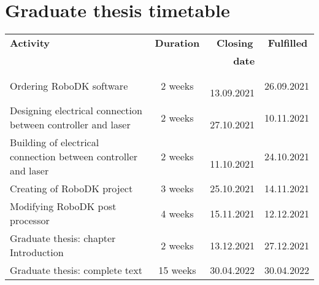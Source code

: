 ﻿\chapter{Graduate thesis timetable \label{ch:ApendPLAN}}


\begin{center}
\begin{tabular}{|p{8cm}|c|r|r|}
  \hline
  \textbf{\hspace{3.3cm} Activity} & \textbf{Duration} & \textbf{Closing\,} & \textbf{Fulfilled\,} \\
  {} & \textbf{} & \textbf{date} & {} \\
  \hline

  {Ordering RoboDK software}
                & {2 weeks} & \,{13.09.2021} & {26.09.2021} \\\hline
  {Designing electrical connection between controller and laser}
                & {2 weeks} & \,{27.10.2021} & {10.11.2021} \\\hline
  {Building of electrical connection between controller and laser}
                & {2 weeks} & \,{11.10.2021} & {24.10.2021} \\\hline
  {Creating of RoboDK project}
                & {3 weeks} & {25.10.2021} & {14.11.2021} \\\hline
  {Modifying RoboDK post processor}
                & {4 weeks} & {15.11.2021} & {12.12.2021} \\\hline
  {Graduate thesis: chapter Introduction}
                & {2 weeks} & {13.12.2021} & {27.12.2021} \\\hline
  {Graduate thesis: complete text}
                & {15 weeks} & {30.04.2022} & {30.04.2022} \\\hline
\end{tabular}
\end{center}






